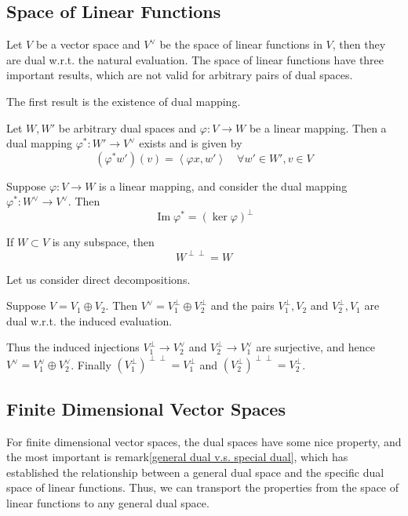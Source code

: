 \subsection{Space of Linear Functions}
Let $V$ be a vector space and $V^\vee $ be the space of linear functions in $V$, then they are dual w.r.t. the natural evaluation.
The space of linear functions have three important results, which are not valid for arbitrary pairs of dual spaces.\par
The first result is the existence of dual mapping.
\begin{theorem}
Let $W,W'$ be arbitrary dual spaces and $\varphi:V\to W$ be a linear mapping. Then a dual mapping $\varphi^*:W'\to V^\vee  $ exists and is given by \[(\varphi^*w')(v)=\left\langle \varphi x,w'\right\rangle\quad\forall w'\in W', v\in V\]
\end{theorem}

\begin{theorem}
Suppose $\varphi:V\to W$ is a linear mapping, and consider the dual mapping $\varphi^*:W^\vee\to V^\vee$. Then \[ \operatorname{Im}\varphi^*=(\ker \varphi)^\perp\]
\end{theorem}

\begin{theorem}
If $W\subset V$ is any subspace, then \[ W^{\perp\perp}=W\]
\end{theorem}
Let us consider direct decompositions.
\begin{theorem}
Suppose $V=V_1\oplus V_2$. Then $V^\vee=V_1^\perp\oplus V_2^\perp $ and the pairs $V_1^\perp,V_2$ and $V_2^\perp,V_1$ are dual w.r.t. the induced evaluation.
\end{theorem}
\begin{remark}
Thus the induced injections $V_1^\perp \to V_2^\vee$ and $V_2^\perp\to V_1^\vee$ are surjective, and hence $V^\vee=V_1^\vee\oplus V_2^\vee$. Finally $(V_1^\perp)^{\perp\perp}=V_1^\perp$ and $(V_2^\perp)^{\perp\perp}=V_2^\perp$.
\end{remark}


\subsection{Finite Dimensional Vector Spaces}
For finite dimensional vector spaces, the dual spaces have some nice property, and the most important is remark\ref{general dual v.s. special dual}, which has established the relationship between a general dual space and the specific dual space of linear functions. Thus, we can transport the properties from the space of linear functions to any general dual space.



